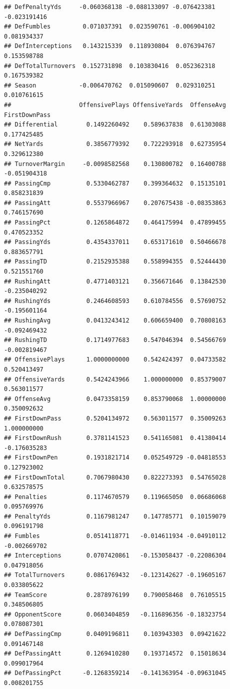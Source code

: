 \documentclass[
]{book}
\begin{document}
\begin{verbatim}
## DefPenaltyYds     -0.060368138 -0.088133097 -0.076423381 -0.023191416
## DefFumbles         0.071037391  0.023590761 -0.006904102  0.081934337
## DefInterceptions   0.143215339  0.118930804  0.076394767  0.153598788
## DefTotalTurnovers  0.152731898  0.103830416  0.052362318  0.167539382
## Season            -0.006470762  0.015090607  0.029310251  0.010761615
##                   OffensivePlays OffensiveYards  OffenseAvg FirstDownPass
## Differential        0.1492260492    0.589637838  0.61303088   0.177425485
## NetYards            0.3856779392    0.722293918  0.62735954   0.329612380
## TurnoverMargin     -0.0098582568    0.130800782  0.16400788  -0.051904318
## PassingCmp          0.5330462787    0.399364632  0.15135101   0.858231839
## PassingAtt          0.5537966967    0.207675438 -0.08353863   0.746157690
## PassingPct          0.1265864872    0.464175994  0.47899455   0.470523352
## PassingYds          0.4354337011    0.653171610  0.50466678   0.883657791
## PassingTD           0.2152935388    0.558994355  0.52444430   0.521551760
## RushingAtt          0.4771403121    0.356671646  0.13842530  -0.235040292
## RushingYds          0.2464608593    0.610784556  0.57690752  -0.195601164
## RushingAvg          0.0413243412    0.606659400  0.70808163  -0.092469432
## RushingTD           0.1714977683    0.547046394  0.54566769  -0.002819467
## OffensivePlays      1.0000000000    0.542424397  0.04733582   0.520413497
## OffensiveYards      0.5424243966    1.000000000  0.85379007   0.563011577
## OffenseAvg          0.0473358159    0.853790068  1.00000000   0.350092632
## FirstDownPass       0.5204134972    0.563011577  0.35009263   1.000000000
## FirstDownRush       0.3781141523    0.541165081  0.41380414  -0.176035283
## FirstDownPen        0.1931821714    0.052549729 -0.04818553   0.127923002
## FirstDownTotal      0.7067980430    0.822273393  0.54765028   0.632578575
## Penalties           0.1174670579    0.119665050  0.06686068   0.095769976
## PenaltyYds          0.1167981247    0.147785771  0.10159079   0.096191798
## Fumbles             0.0514118771   -0.014611934 -0.04910112  -0.002669702
## Interceptions       0.0707420861   -0.153058437 -0.22086304   0.047918056
## TotalTurnovers      0.0861769432   -0.123142627 -0.19605167   0.033805622
## TeamScore           0.2878976199    0.790058468  0.76105515   0.348506805
## OpponentScore       0.0603404859   -0.116896356 -0.18323754   0.078087301
## DefPassingCmp       0.0409196811    0.103943303  0.09421622   0.091467148
## DefPassingAtt       0.1269410280    0.193714572  0.15018634   0.099017964
## DefPassingPct      -0.1268359214   -0.141363954 -0.09631045   0.008201755

\end{verbatim}
\end{document}
